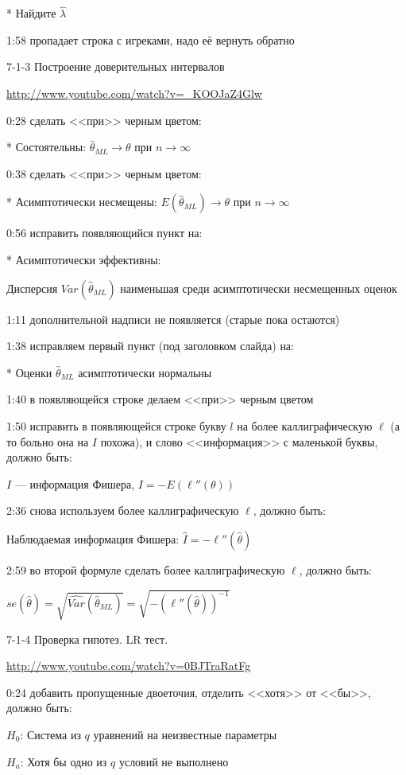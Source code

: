 \documentclass[12pt,a4paper]{article}\usepackage[]{graphicx}\usepackage[]{color}
\begin{document}
* Найдите $\hat{\lambda}$

1:58 пропадает строка с игреками, надо её вернуть обратно


7-1-3 Построение доверительных интервалов

\url{http://www.youtube.com/watch?v=_KOOJaZ4Glw}

0:28 сделать <<при>> черным цветом:

* Состоятельны: $\hat{\theta}_{ML} \to \theta$ при $n\to \infty$

0:38 сделать <<при>> черным цветом:

* Асимптотически несмещены: $E(\hat{\theta}_{ML}) \to \theta$ при $n\to \infty$

0:56 исправить появляющийся пункт на:

* Асимптотически эффективны: 

Дисперсия $Var(\hat{\theta}_{ML})$ наименьшая среди асимптотически несмещенных оценок

1:11 дополнительной надписи не появляется (старые пока остаются)

1:38 исправляем первый пункт (под заголовком слайда) на:

* Оценки $\hat{\theta}_{ML}$  асимптотически нормальны

1:40 в появляющейся строке делаем <<при>> черным цветом

1:50 исправить в появляющейся строке букву $l$ на более каллиграфическую $\ell$ (а то больно она на $I$ похожа), и слово <<информация>> с маленькой буквы, должно быть:

$I$ --- информация Фишера, $I=-E\left( \ell ''(\theta) \right)$

2:36 снова используем более каллиграфическую $\ell$, должно быть:

Наблюдаемая информация Фишера: $\hat{I}=-\ell ''(\hat{\theta})$ 

2:59 во второй формуле сделать более каллиграфическую $\ell$, должно быть:

$se(\hat{\theta})=\sqrt{\widehat{Var}(\hat{\theta}_{ML})}=\sqrt{-(\ell ''(\hat{\theta}))^{-1}}$


7-1-4 Проверка гипотез. LR тест.

\url{http://www.youtube.com/watch?v=0BJTraRatFg}

0:24 добавить пропущенные двоеточия, отделить <<хотя>> от <<бы>>, должно быть:

$H_0$: Система из $q$ уравнений на неизвестные параметры

$H_a$: Хотя бы одно из $q$ условий не выполнено
\end{document}
